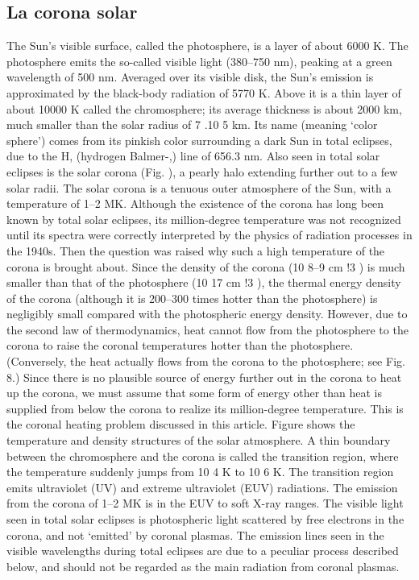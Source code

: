 \subsection{La corona solar}
The Sun’s visible surface, called the photosphere, is a layer of about 6000 K. The photosphere emits the so-called visible light (380–750 nm), peaking at a green wavelength of 500 nm. Averaged over its visible disk, the Sun’s emission is approximated by the black-body radiation of 5770 K. Above it is a thin layer of about 10000 K called the chromosphere; its average thickness is about 2000 km, much smaller than the solar radius of 7 .10 5 km. Its name (meaning ‘color sphere’) comes from its pinkish color surrounding a dark Sun in total eclipses, due to the H, (hydrogen Balmer-,) line of 656.3 nm. Also seen in total solar eclipses is the solar corona (Fig. ), a pearly halo extending further out to a few solar radii. The solar corona is a tenuous outer atmosphere of the Sun, with a temperature of 1–2 MK. Although the existence of the corona has long been known by total solar eclipses, its million-degree temperature was not recognized until its spectra were correctly interpreted by the physics of radiation processes in the 1940s.
Then the question was raised why such a high temperature of the corona is brought about. Since the density of the corona (10 8–9 cm !3 ) is much smaller than that of the photosphere (10 17 cm !3 ), the thermal energy density of the corona (although it is 200–300 times hotter than the photosphere) is negligibly small compared with the photospheric energy density. However, due to the second law of thermodynamics, heat cannot flow from the photosphere to the corona to raise the coronal temperatures hotter than the photosphere. (Conversely, the heat actually flows from the corona to the photosphere; see Fig. 8.) Since there is no plausible source of energy further out in the corona to heat up the corona, we must assume that some form of energy other than heat is supplied from below the corona to realize its million-degree temperature. This is the coronal heating problem discussed in this article.
Figure  shows the temperature and density structures of the solar atmosphere. A thin boundary between the chromosphere and the corona is called the transition region, where the temperature suddenly jumps from 10 4 K to 10 6 K. The transition region emits ultraviolet (UV) and extreme ultraviolet (EUV) radiations. The emission from the corona of 1–2 MK is in the EUV to soft X-ray ranges. The visible light seen in total solar eclipses is photospheric light scattered by free electrons in the corona, and not ‘emitted’ by coronal plasmas. The emission lines seen in the visible wavelengths during total eclipses are due to a peculiar process described below, and should not be regarded as the main radiation from coronal plasmas. \citet{sakurai_2017}

